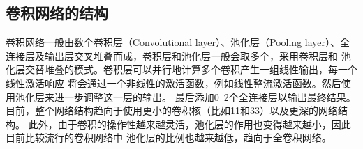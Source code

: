   
  \subsection{\hei\xiaosan\textbf{卷积网络的结构}}
    卷积网络一般由数个卷积层（Convolutional layer）、池化层（Pooling 
    layer）、全连接层及输出层交叉堆叠而成，卷积层和池化层一般会取多个，采用卷积层和
    池化层交替堆叠的模式。卷积层可以并行地计算多个卷积产生一组线性输出，每一个线性激活响应
    将会通过一个非线性的激活函数，例如线性整流激活函数。然后使用池化层来进一步调整这一层的输出。
    最后添加0~2个全连接层以输出最终结果。
    目前，整个网络结构趋向于使用更小的卷积核（比如11和33）以及更深的网络结构。
    此外，由于卷积的操作性越来越灵活，池化层的作用也变得越来越小，因此目前比较流行的卷积网络中
    池化层的比例也越来越低，趋向于全卷积网络。
    
   
